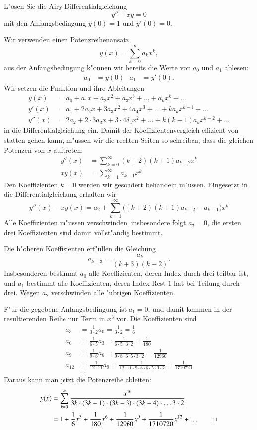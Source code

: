 L"osen Sie die Airy-Differentialgleichung
\[
y''-xy=0
\]
mit den Anfangsbedingung $y(0)=1$ und $y'(0)=0$.

\begin{loesung}
Wir verwenden einen Potenzreihenansatz
\[
y(x)=\sum_{k=0}^\infty a_kx^k,
\]
aus der Anfangsbedingung k"onnen wir bereits die Werte von $a_0$ und
$a_1$ ablesen:
\begin{align*}
a_0&=y(0)&
a_1&=y'(0).
\end{align*}
Wir setzen die Funktion und ihre Ableitungen
\begin{align*}
y(x)&=a_0+a_1x+a_2x^2+a_3x^3+\dots+a_kx^k+\dots
\\
y'(x)&=a_1+2a_2x+3a_3x^2+4a_4x^3+\dots+ka_kx^{k-1}+\dots
\\
y''(x)&=2a_2+2\cdot 3a_3x + 3\cdot 4d_4x^2+\dots +k(k-1)a_kx^{k-2}+\dots
\end{align*}
in die Differentialgleichung ein.
Damit der Koeffizientenvergleich effizient von statten gehen kann,
m"ussen wir die rechten Seiten so schreiben, dass die gleichen Potenzen
von $x$ auftreten:
\begin{align*}
y''(x)
&=
\sum_{k=0}^\infty (k+2)(k+1)a_{k+2}x^k
\\
xy(x)
&=
\sum_{k=1}^\infty a_{k-1}x^k
\end{align*}
Den Koeffizienten $k=0$ werden wir gesondert behandeln m"ussen.
Eingesetzt in die Differentialgleichung erhalten wir
\[
y''(x)-xy(x)
=
a_2 + \sum_{k=1}^\infty \bigl((k+2)(k+1)a_{k+2}-a_{k-1}\bigr)x^k
\]
Alle Koeffizienten m"ussen verschwinden, insbesondere folgt $a_2=0$,
die ersten drei Koeffizienten sind damit vollst"andig bestimmt.

Die h"oheren Koeffizienten erf"ullen die Gleichung
\[
a_{k+3}=\frac{a_k}{(k+3)(k+2)}.
\]
Insbesonderen bestimmt $a_0$ alle Koeffizienten, deren Index durch
drei teilbar ist, und $a_1$ bestimmt alle Koeffizienten, deren Index
Rest $1$ hat bei Teilung durch drei.
Wegen $a_2$ verschwinden alle "ubrigen Koeffizienten.

F"ur die gegebene Anfangsbedingung ist $a_1=0$, und damit kommen in der
resultierenden Reihe nur Term in $x^3$ vor.
Die Koeffizienten sind
\begin{align*}
a_3&=\frac1{3\cdot 2}a_0=\frac1{3\cdot 2}=\frac16\\
a_6&=\frac1{6\cdot 5}a_3=\frac1{6\cdot 5\cdot 3\cdot 2}=\frac1{180}\\
a_9&=\frac1{9\cdot 8}a_6=\frac1{9\cdot 8\cdot 6\cdot 5\cdot 3\cdot 2}=\frac1{12960}\\
a_{12}&=\frac1{12\cdot 11}a_9=\frac1{12\cdot 11\cdot 9\cdot 8\cdot 6\cdot 5\cdot 3\cdot 2}=\frac1{1710720}
\\
&\dots
\end{align*}
Daraus kann man jetzt die Potenzreihe ableiten:
\begin{align*}
y(x)
&=
\sum_{k=0}^\infty \frac{x^{3k}}{3k\cdot(3k-1)\cdot (3k-3)\cdot(3k-4)\cdot \dots 3\cdot 2}
\\
&=
1 + \frac16x^3+\frac1{180}x^6+\frac1{12960}x^9+\frac1{1710720}x^{12}+\dots
\qedhere
\end{align*}
\end{loesung}

